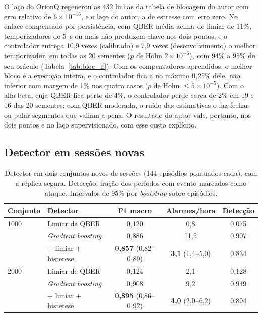 \documentclass[12pt]{article}
\begin{document}
O laço do OrionQ regenerou as 432 linhas da tabela de blocagem do autor com erro
relativo de $6\times10^{-16}$, e o laço do autor, a de estresse com erro zero. No
enlace compensado por persistência, com QBER média acima do limiar de 11\%,
temporizadores de 5~s ou mais não produzem chave nos dois pontos, e o controlador
entrega 10,9 vezes (calibrado) e 7,9 vezes (desenvolvimento) o melhor temporizador,
em todas as 20 sementes ($p$ de Holm $2\times10^{-6}$), com 94\% a 95\% do seu
oráculo (Tabela~\ref{tab:bloc_lf}). Com os compensadores aprendidos, o melhor
bloco é a execução inteira, e o controlador fica a no máximo 0,25\% dele, não
inferior com margem de 1\% nos quatro casos ($p$ de Holm $\leq 5\times10^{-5}$).
Com o alfa-beta, cuja QBER fica perto de 4\%, o controlador perde cerca de 2\%
em 19 e 16 das 20 sementes: com QBER moderada, o ruído das estimativas o faz
fechar ou pular segmentos que valiam a pena. O resultado do autor vale, portanto,
nos dois pontos e no laço supervisionado, com esse custo explícito.

\subsection{Detector em sessões novas}

\begin{table}[ht]
\centering
\caption{Detector em dois conjuntos novos de sessões (144 episódios pontuados
cada), com a réplica segura. Detecção: fração dos períodos com evento marcados
como ataque. Intervalos de 95\% por \textit{bootstrap} sobre episódios.}
\label{tab:det_novo}
\small
\begin{tabular}{llccc}
\toprule
Conjunto & Detector & F1 macro & Alarmes/hora & Detecção \\
\midrule
1000 & Limiar de QBER & 0,120 & 0,8 & 0,075 \\
 & \textit{Gradient boosting} & 0,886 & 11,5 & 0,907 \\
 & + limiar + histerese & \textbf{0,857} (0,82--0,89) & \textbf{3,1} (1,4--5,0) & 0,834 \\
2000 & Limiar de QBER & 0,124 & 2,1 & 0,128 \\
 & \textit{Gradient boosting} & 0,908 & 9,2 & 0,949 \\
 & + limiar + histerese & \textbf{0,895} (0,86--0,92) & \textbf{4,0} (2,0--6,2) & 0,894 \\
\bottomrule
\end{tabular}
\end{table}
\end{document}
